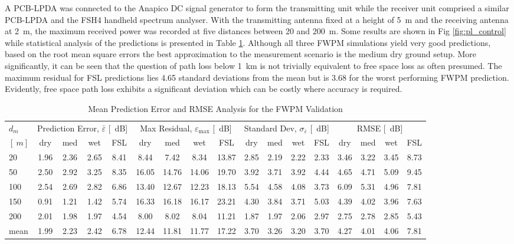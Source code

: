 \documentclass[10pt,journal,twoside]{IEEEtran}
\renewcommand{\arraystretch}{1.3}
\begin{document}
A PCB-LPDA was connected to the Anapico DC signal generator to form the transmitting unit while the receiver unit comprised a similar PCB-LPDA and the FSH4 handheld spectrum analyser. With the transmitting antenna fixed at a height of \SI{5}{m} and the receiving antenna at \SI{2}{m}, the maximum received power was recorded at five distances between \SI{20}{} and \SI{200}{m}. Some results are shown in Fig \ref{fig:pl_control} while statistical analysis of the predictions is presented in Table \ref{tb:stats1}. Although all three FWPM simulations yield very good predictions, based on the root mean square errors the best approximation to the measurement scenario is the medium dry ground setup. More significantly, it can be seen that the question of path loss below \SI{1}{km} is not trivially equivalent to free space loss as often presumed. The maximum residual for FSL predictions lies \num{4.65} standard deviations from the mean but is \num{3.68} for the worst performing FWPM prediction. Evidently, free space path loss exhibits a significant deviation which can be costly where accuracy is required.
%
\begin{table}[!ht]
	\caption{Mean Prediction Error and RMSE Analysis for the FWPM Validation}
	\label{tb:stats1}
	\centering
	\renewcommand{\arraystretch}{1.3}
	\setlength{\tabcolsep}{3pt}
	\begin{tabular*}{\linewidth}{ @{\extracolsep{\fill}} l*{16}c @{}}\toprule
		$d_m$ & \multicolumn{4}{c}{Prediction Error, $\bar\varepsilon$ [\SI{}{dB}]} & \multicolumn{4}{c}{Max Residual, $\varepsilon_{\text{max}}$ [\SI{}{dB}]} & \multicolumn{4}{c}{Standard Dev, $\sigma_{\bar\varepsilon}$ [\SI{}{dB}]} & \multicolumn{4}{c}{RMSE [\SI{}{dB}]}\\ \cmidrule{1-1} \cmidrule{2-5} \cmidrule{6-9} \cmidrule{10-13} \cmidrule{14-17}%
		$[\SI{}{m}]$ & dry & med & wet & FSL & dry & med & wet & FSL & dry & med & wet & FSL & dry & med & wet & FSL\\
		 \cmidrule{1-1} \cmidrule{2-5} \cmidrule{6-9} \cmidrule{10-13} \cmidrule{14-17}
		20   & 1.96 & 2.36 & 2.65 & 8.41 &{} 8.44  & 7.42  & 8.34  & 13.87 &{} 2.85 & 2.19 & 2.22 & 2.33 &{} 3.46 & 3.22 & 3.45 & 8.73\\
		50   & 2.50 & 2.92 & 3.25 & 8.35 &{} 16.05 & 14.76 & 14.06 & 19.70 &{} 3.92 & 3.71 & 3.92 & 4.44 &{} 4.65 & 4.71 & 5.09 & 9.45\\
		100  & 2.54 & 2.69 & 2.82 & 6.86 &{} 13.40 & 12.67 & 12.23 & 18.13 &{} 5.54 & 4.58 & 4.08 & 3.73 &{} 6.09 & 5.31 & 4.96 & 7.81\\
		150  & 0.91 & 1.21 & 1.42 & 5.74 &{} 16.33 & 16.18 & 16.17 & 23.21 &{} 4.30 & 3.84 & 3.71 & 5.03 &{} 4.39 & 4.02 & 3.96 & 7.63\\
		200  & 2.01 & 1.98 & 1.97 & 4.54 &{} 8.00  & 8.02  & 8.04  & 11.21 &{} 1.87 & 1.97 & 2.06 & 2.97 &{} 2.75 & 2.78 & 2.85 & 5.43\\ \cmidrule{1-1} \cmidrule{2-5} \cmidrule{6-9} \cmidrule{10-13} \cmidrule{14-17}
		mean & 1.99 & 2.23 & 2.42 & 6.78 &{} 12.44 & 11.81 & 11.77 & 17.22 &{} 3.70 & 3.26 & 3.20 & 3.70 &{} 4.27 & 4.01 & 4.06 & 7.81\\ \bottomrule
	\end{tabular*}
\end{table}
\end{document}
